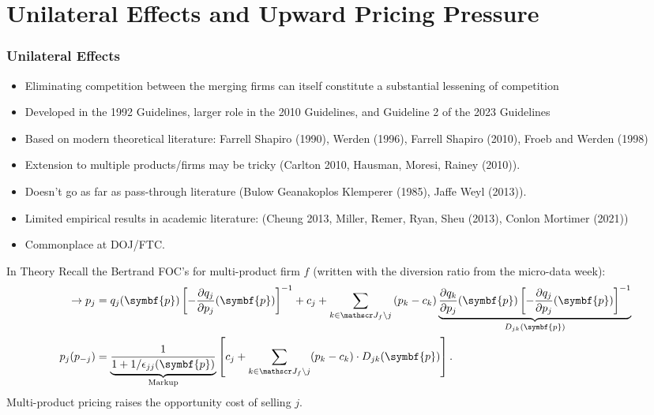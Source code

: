 \documentclass[aspectratio=169,10pt]{beamer}
\begin{document}
\section{Unilateral Effects and Upward Pricing Pressure}

\begin{frame}
\frametitle{Unilateral Effects}
\begin{itemize}
\item Eliminating competition between the merging firms can itself constitute a substantial lessening of competition
\item Developed in the 1992 Guidelines, larger role in the 2010 Guidelines, and Guideline 2 of the 2023 Guidelines
\item Based on modern theoretical literature: Farrell Shapiro (1990), Werden (1996), Farrell Shapiro (2010), Froeb and Werden (1998)
\item Extension to multiple products/firms may be tricky (Carlton 2010, Hausman, Moresi, Rainey (2010)).
\item Doesn't go as far as pass-through literature (Bulow Geanakoplos Klemperer (1985), Jaffe Weyl (2013)). 
\item Limited empirical results in academic literature: (Cheung 2013, Miller, Remer, Ryan, Sheu (2013), Conlon Mortimer (2021))
\item Commonplace at DOJ/FTC.
\end{itemize} 
\end{frame}

\begin{frame}{In Theory}
\footnotesize
Recall the Bertrand FOC's for multi-product firm $f$ (written with the diversion ratio from the micro-data week):
\begin{align*}
\label{eq:best_response}
\rightarrow \nonumber p_j &=q_{j}(\symbf{p}) \left[-\frac{\partial q_{j}}{\partial p_{j}}(\symbf{p})\right]^{-1} + c_{j} + \sum_{k \in \calJ_{f} \setminus j} \left(p_{k}-c_{k}\right) \underbrace{\frac{\partial q_{k}}{\partial p_{j}}(\symbf{p})\left[-\frac{\partial q_{j}}{\partial p_{j}}(\symbf{p})\right]^{-1}}_{D_{jk}(\symbf{p})}\\
p_j(p_{-j}) &= \underbrace{\frac{1}{1+1/\epsilon_{jj}(\symbf{p})}}_{\text{Markup}} \left[ c_j + \sum_{k \in \calJ_{f} \setminus j}  (p_k-c_k) \cdot  D_{jk} (\symbf{p}) \right].
\end{align*}
Multi-product pricing \alert{raises the opportunity cost} of selling $j$.
\end{frame}
\end{document}
